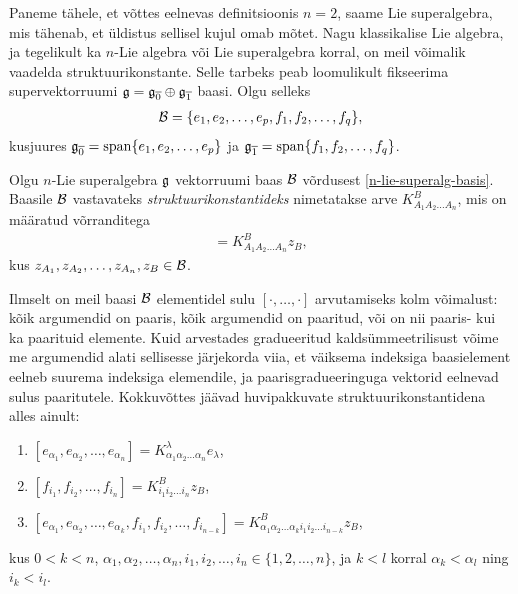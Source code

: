 Paneme tähele, et võttes eelnevas definitsioonis
$n = 2$, saame Lie superalgebra, mis tähenab, et üldistus
sellisel kujul omab mõtet. Nagu klassikalise Lie algebra, ja tegelikult
ka $n$-Lie algebra või Lie superalgebra korral, on meil võimalik vaadelda
struktuurikonstante. Selle tarbeks peab loomulikult fikseerima
supervektorruumi $\mathfrak{g} = \mathfrak{g}_{\overline{0}} \oplus \mathfrak{g}_{\overline{1}}$
baasi. Olgu selleks
\begin{align}\label{n-lie-superalg-basis}
    \mathcal{B} = \{ e_1, e_2, \dots, e_p, f_1, f_2, \dots, f_q \},
\end{align}
kusjuures $\mathfrak{g}_{\overline{0}} = \operatorname{span} \{e_1, e_2, \dots, e_p\}$
ja $\mathfrak{g}_{\overline{1}} = \operatorname{span} \{f_1, f_2, \dots, f_q\}$.

\begin{dfn}
    Olgu $n$-Lie superalgebra $\mathfrak{g}$ vektorruumi baas $\mathcal{B}$ võrdusest
    \eqref{n-lie-superalg-basis}. Baasile $\mathcal{B}$ vastavateks
    \emph{struktuurikonstantideks} nimetatakse arve
    $K_{A_1 A_2 \dots A_n}^{B}$, mis on määratud võrranditega
    \begin{align*}
        [z_{A_1}, z_{A_2}, \dots, z_{A_n}] =
        K_{A_1 A_2 \dots A_n}^{B} z_B,
    \end{align*}
    kus $z_{A_1}, z_{A_2}, \dots, z_{A_n}, z_B \in \mathcal{B}$.
\end{dfn}

Ilmselt on meil baasi $\mathcal{B}$ elementidel sulu $[\cdot, \dots, \cdot]$
arvutamiseks kolm võimalust: kõik argumendid on paaris, kõik
argumendid on paaritud, või on nii paaris- kui ka paarituid elemente.
Kuid arvestades gradueeritud kaldsümmeetrilisust võime me
argumendid alati sellisesse järjekorda viia, et väiksema indeksiga
baasielement eelneb suurema indeksiga elemendile, ja
paarisgradueeringuga vektorid eelnevad sulus paaritutele.
Kokkuvõttes jäävad huvipakkuvate struktuurikonstantidena alles ainult:
\begin{enumerate}[label=\arabic*)]
    \item $[e_{\alpha_1}, e_{\alpha_2}, \dots, e_{\alpha_n}] =
        K_{\alpha_1 \alpha_2 \dots \alpha_n}^{\lambda} e_{\lambda}$,
    \item $[f_{i_1}, f_{i_2}, \dots, f_{i_n}] =
        K_{i_1 i_2 \dots i_n}^{B} z_{B}$,
    \item $[e_{\alpha_1}, e_{\alpha_2}, \dots, e_{\alpha_k},
            f_{i_1}, f_{i_2}, \dots, f_{i_{n-k}}] =
        K_{
            \alpha_1 \alpha_2 \dots \alpha_k i_1 i_2 \dots i_{n-k}
        }^{B} z_{B}$,
\end{enumerate}
kus $0 < k < n$, $\alpha_1, \alpha_2, \dots, \alpha_n,
i_1, i_2, \dots, i_n \in \{1, 2, \dots, n\}$, ja $k < l$ korral
$\alpha_k < \alpha_l$ ning $i_k < i_l$.

